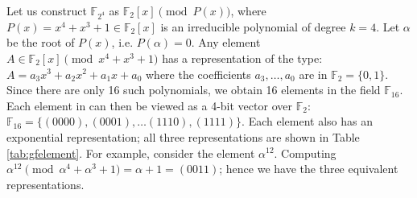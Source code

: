


\begin{Example}\label{ex:1}
Let us construct ${\mathbb{F}}_{2^4}$ as ${\mathbb{F}}_2[x] \pmod{
  P(x)}$, where $P(x)=x^4+x^3+1 \in {\mathbb{F}}_2[x]$ is an
irreducible polynomial of degree $k =4$. Let $\alpha$ be the root of
$P(x)$, i.e. $P(\alpha)=0$.  Any element $A \in {\mathbb{F}}_2[x]
\pmod{ x^4 + x^3 + 1}$ has a representation of the type: $A = a_3 x^3
+ a_2 x^2 +  a_1 x + a_0$ where the coefficients $a_3, \dots, a_0$ are
in ${\mathbb{F}}_2 = \{0, 1\}$. Since there are only 16 such
polynomials, we obtain 16 elements in the field
${\mathbb{F}}_{16}$. Each element in can then be viewed as a 4-bit
vector over ${\mathbb{F}}_2$: ${\mathbb{F}}_{16}=\{(0000),(0001),
\dots (1110),(1111)\}$.  Each element also has an exponential
representation; all three representations are shown in Table
\ref{tab:gfelement}. For example, consider the element $\alpha^{12}$.
Computing $\alpha^{12} \pmod{ \alpha^4+\alpha^3+1} = \alpha + 1
= (0011)$; hence we have the three equivalent representations. 


\end{Example}
